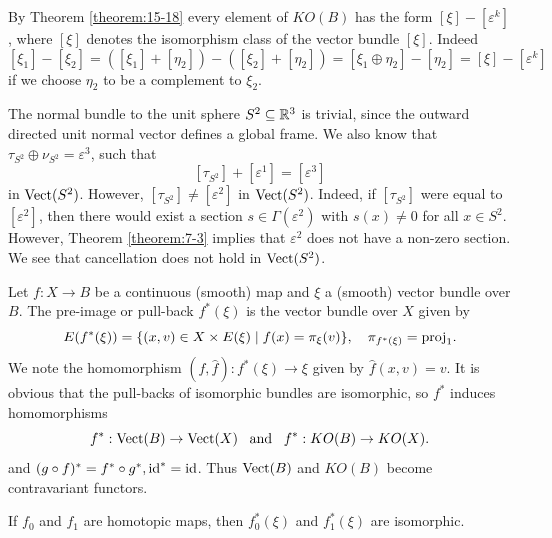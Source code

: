 By Theorem \ref{theorem:15-18} every element of $KO(B)$ has the form $[\xi]-[\varepsilon^k]$, 
where $[\xi]$ denotes the isomorphism class of the vector bundle $[\xi]$. Indeed
\[
  [\xi_1] -[\xi_2]
  = ([\xi_1]+[\eta_2]) - ([\xi_2]+[\eta_2])
  = [\xi_1\oplus\eta_2] - [\eta_2]
  = [\xi] - [\varepsilon^k]
\]
if we choose $\eta_2$ to be a complement to $\xi_2$.

\begin{example}\label{example:15-19}
  The normal bundle to the unit sphere $S^2\subseteq {\ensuremath{\mathbb{R}}}^3$ is trivial, since
  the outward directed unit normal vector defines a global frame. We also know
  that $\tau_{S^2}\oplus\nu_{S^2}=\varepsilon^3$, such that
  \[
    [\tau_{S^2}] + [\varepsilon^1] = [\varepsilon^3]
  \]
  in $\mathrm{Vect}(S^2)$. However, $[\tau_{S^2}]\neq [\varepsilon^2]$ in $\mathrm{Vect}(S^2)$. 
  Indeed, if $[\tau_{S^2}]$ were equal to $[\varepsilon^2]$, then there would exist a 
  section $s\in\Gamma(\varepsilon^2)$ with $s(x)\neq 0$ for all $x\in S^2$.
  However, Theorem \ref{theorem:7-3} implies that $\varepsilon^2$ does not have a 
  non-zero section. We see that cancellation does not hold in $\mathrm{Vect}(S^2)$.
\end{example}

\begin{definition}\label{definition:15-20}
  Let $f: X\to B$ be a continuous (smooth) map and $\xi$ a (smooth) vector bundle over $B$. 
  The pre-image or pull-back $f^*(\xi)$ is the vector bundle over $X$ given by
  \[
    E(f^*(\xi)) = \{(x, v)\in X\times E(\xi)\mid f(x)=\pi_\xi(v)\}, \quad 
    \pi_{f^*(\xi)} = \mathrm{proj}_1.
  \]
  We note the homomorphism $(f, \hat f):f^*(\xi)\to \xi$ given by $\hat f(x, v) = v$. It is
  obvious that the pull-backs of isomorphic bundles are isomorphic, so $f^*$ induces homomorphisms
  \[
    f^*:\mathrm{Vect}(B)\to \mathrm{Vect}(X) \enspace\text{ and }\enspace
    f^*:KO(B) \to KO(X).
  \]
  and $(g\circ f)^*=f^*\circ g^*, \operatorname{id}^*=\operatorname{id}$. Thus $\mathrm{Vect}(B)$ and $KO(B)$ become contravariant functors.
\end{definition}

\begin{theorem}\label{theorem:15-21}
  If $f_0$ and $f_1$ are homotopic maps, then $f^*_0(\xi)$ and $f^*_1(\xi)$ are isomorphic.
\end{theorem}

